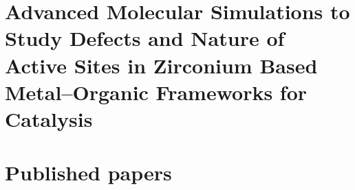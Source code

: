 \documentclass[10pt,twoside]{book}
\newcommand\oddpageleftmark{}
\newcommand\evenpagerightmark{}
\begin{document}
\renewcommand*{\thesection}{\thechapter.\arabic{section}}       %


%
%


\graphicspath{{figures/}}
%
%

%

	

\mainmatter     %
\renewcommand*{\thesection}{\thechapter.\arabic{section}}

\newcommand\fdtsvrightmarktmp{{\scshape\small Chapter }}
\renewcommand\evenpagerightmark{{\scshape\small\chaptername\ \thechapter}}
\renewcommand\oddpageleftmark{{\scshape\small\leftmark}}



\baselineskip 13.0pt

\part{Advanced Molecular Simulations to Study Defects and Nature of
Active Sites in Zirconium Based Metal--Organic Frameworks for Catalysis}
\graphicspath{{figures/}}






\part{Published papers}

%

\appendix

%



% 
\clearpage{\pagestyle{empty}\cleardoublepage}





\cleardoublepage

\end{document}

